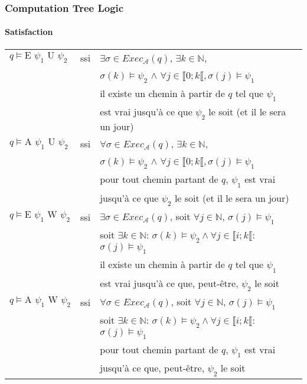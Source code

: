 \documentclass[11pt]{beamer}
\begin{document}
\begin{frame}
    \frametitle{Computation Tree Logic}
    \framesubtitle{Satisfaction}

    \footnotesize
    \begin{tabular}{lcl}
    $q \vDash \mbox{E } \psi_1 \mbox{ U } \psi_2$ &ssi&
    $\exists \sigma \in Exec_\mathcal{A}(q)$, $\exists k \in \mathbb{N}$,\\
    &&$\sigma(k)\vDash \psi_2$ $\land$ $\forall j \in \llbracket 0; k\llbracket, \sigma(j)\vDash \psi_1$\\
    && \pause[2] il existe un chemin à partir de $q$ tel que $\psi_1$\\&& est vrai jusqu'à ce que $\psi_2$ le soit (et il le sera un jour) \pause[1]\\

    $q \vDash \mbox{A } \psi_1 \mbox{ U } \psi_2$ &ssi&
    $\forall \sigma \in Exec_\mathcal{A}(q)$, $\exists k \in \mathbb{N}$,\\
    &&$\sigma(k)\vDash \psi_2$ $\land$ $\forall j \in \llbracket 0; k\llbracket, \sigma(j)\vDash \psi_1$\\
    &&\pause[2] pour tout chemin partant de $q$, $\psi_1$ est vrai \\&& jusqu'à ce que $\psi_2$ le soit (et il le sera un jour)\pause[1]\\

    $q \vDash \mbox{E } \psi_1 \mbox{ W } \psi_2$ &ssi&
    $\exists \sigma \in Exec_\mathcal{A}(q)$, soit $\forall j \in \mathbb{N}$, $\sigma(j) \vDash \psi_1$\\
    & & \pause[2]soit $\exists k\in \mathbb{N}$: $\sigma(k)\vDash \psi_2 \land \forall j \in \llbracket i; k \llbracket$: $\sigma(j) \vDash \psi_1$\\
    && il existe un chemin à partir de $q$ tel que $\psi_1$\\&& est vrai jusqu'à ce que, peut-être, $\psi_2$ le soit\pause[1]\\

    $q \vDash \mbox{A } \psi_1 \mbox{ W } \psi_2$ &ssi&
    $\forall \sigma \in Exec_\mathcal{A}(q)$, soit $\forall j \in \mathbb{N}$, $\sigma(j) \vDash \psi_1$\\
    & & \pause[2]soit $\exists k\in \mathbb{N}$: $\sigma(k)\vDash \psi_2 \land \forall j \in \llbracket i; k \llbracket$: $\sigma(j) \vDash \psi_1$\\
    && pour tout chemin partant de $q$, $\psi_1$ est vrai \\&& jusqu'à ce que, peut-être, $\psi_2$ le soit\pause[1]\\
    \end{tabular}

\end{frame}
\end{document}
